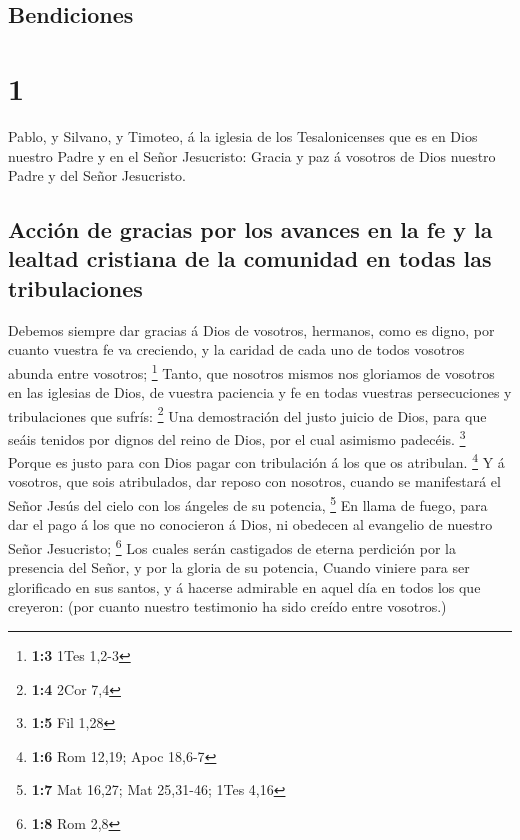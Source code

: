 \hypertarget{bendiciones}{%
\subsection{Bendiciones}\label{bendiciones}}

\hypertarget{section}{%
\section{1}\label{section}}

 Pablo, y Silvano, y Timoteo, á la iglesia de los
Tesalonicenses que es en Dios nuestro Padre y en el Señor Jesucristo:
 Gracia y paz á vosotros de Dios nuestro Padre y del Señor
Jesucristo.

\hypertarget{acciuxf3n-de-gracias-por-los-avances-en-la-fe-y-la-lealtad-cristiana-de-la-comunidad-en-todas-las-tribulaciones}{%
\subsection{Acción de gracias por los avances en la fe y la lealtad
cristiana de la comunidad en todas las
tribulaciones}\label{acciuxf3n-de-gracias-por-los-avances-en-la-fe-y-la-lealtad-cristiana-de-la-comunidad-en-todas-las-tribulaciones}}

 Debemos siempre dar gracias á Dios de vosotros, hermanos,
como es digno, por cuanto vuestra fe va creciendo, y la caridad de cada
uno de todos vosotros abunda entre vosotros; \footnote{\textbf{1:3} 1Tes
  1,2-3}  Tanto, que nosotros mismos nos gloriamos de
vosotros en las iglesias de Dios, de vuestra paciencia y fe en todas
vuestras persecuciones y tribulaciones que sufrís: \footnote{\textbf{1:4}
  2Cor 7,4}  Una demostración del justo juicio de Dios, para
que seáis tenidos por dignos del reino de Dios, por el cual asimismo
padecéis. \footnote{\textbf{1:5} Fil 1,28}  Porque es justo
para con Dios pagar con tribulación á los que os atribulan. \footnote{\textbf{1:6}
  Rom 12,19; Apoc 18,6-7}  Y á vosotros, que sois
atribulados, dar reposo con nosotros, cuando se manifestará el Señor
Jesús del cielo con los ángeles de su potencia, \footnote{\textbf{1:7}
  Mat 16,27; Mat 25,31-46; 1Tes 4,16}  En llama de fuego,
para dar el pago á los que no conocieron á Dios, ni obedecen al
evangelio de nuestro Señor Jesucristo; \footnote{\textbf{1:8} Rom 2,8}
 Los cuales serán castigados de eterna perdición por la
presencia del Señor, y por la gloria de su potencia, 
Cuando viniere para ser glorificado en sus santos, y á hacerse admirable
en aquel día en todos los que creyeron: (por cuanto nuestro testimonio
ha sido creído entre vosotros.)

